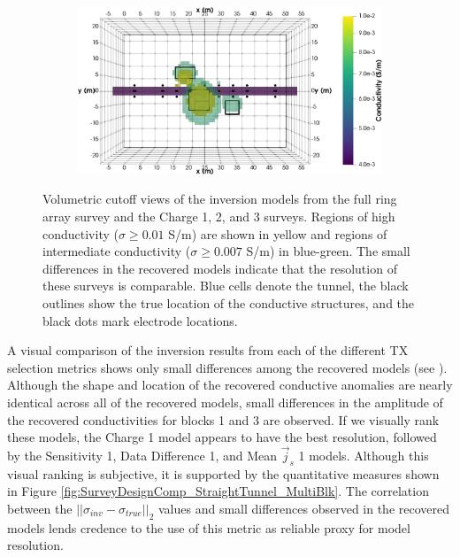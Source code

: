 \documentclass[preprint,authoryear,12pt]{elsarticle}
\begin{document}
\begin{figure}[htp]{}
\begin{center}
\begin{subfigure}{0.55\linewidth}
      \end{subfigure}
      \hspace{-4.0cm}
      \qquad
      \begin{subfigure}{0.55\linewidth}
         \label{fig:InvMod_MultiBlk_StraightTunnel_Charge3_Top_ISO}
         \includegraphics[trim=0cm 0cm 0cm 0cm, clip=true,width=\linewidth]{./figures/Fig22h.png}
      \end{subfigure}
      \vspace{0.2cm}

   \end{center}
\vspace{-0.4cm}
\caption{Volumetric cutoff views of the inversion models from the full ring array survey and the Charge 1, 2, and 3 surveys. Regions of high conductivity ($\sigma \geq 0.01$ S/m) are shown in yellow and regions of intermediate conductivity ($\sigma \geq 0.007$ S/m) in blue-green. The small differences in the recovered models indicate that the resolution of these surveys is comparable. Blue cells denote the tunnel, the black outlines show the true location of the conductive structures, and the black dots mark electrode locations.}
\label{fig:InvMod_SurveyDesign_MultiBlk_Isosurfaces_ChargeVsFullRing_Comp}
\end{figure}


A visual comparison of the inversion results from each of the different TX selection metrics shows only small differences among the recovered models (see \citet{Mitchell2020}). Although the shape and location of the recovered conductive anomalies are nearly identical across all of the recovered models, small differences in the amplitude of the recovered conductivities for blocks 1 and 3 are observed. If we visually rank these models, the Charge 1 model appears to have the best resolution, followed by the Sensitivity 1, Data Difference 1, and Mean $\vec{j}_s$ 1 models. Although this visual ranking is subjective, it is supported by the quantitative measures shown in Figure \ref{fig:SurveyDesignComp_StraightTunnel_MultiBlk}. The correlation between the $\left|| \sigma_{inv} - \sigma_{true} \right||_2$ values and small differences observed in the recovered models lends credence to the use of this metric as reliable proxy for model resolution.
\end{document}
